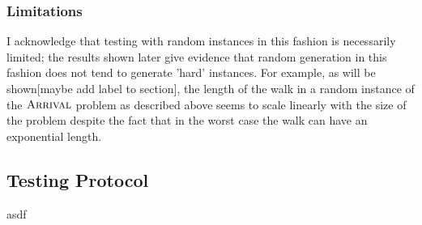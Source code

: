\subsubsection{Limitations}
I acknowledge that testing with random instances in this fashion is necessarily limited; the results
shown later give evidence that random generation in this fashion does not tend to generate 'hard' instances.
For example, as will be shown[maybe add label to section], the length of the walk in a random instance
of the $\textsc{Arrival}$ problem as described above seems to scale linearly with the size of the problem despite
the fact that in the worst case the walk can have an exponential length.

\subsection{Testing Protocol}
asdf
